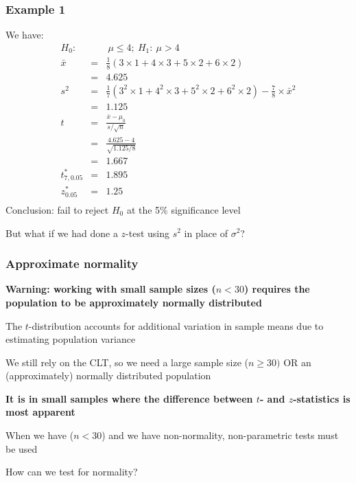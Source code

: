 \documentclass[t,8pt]{beamer}%
\begin{document}
\begin{frame}
	\frametitle{Example 1}
    We have:
    \begin{eqnarray*}
        H_0:&&\ \mu\leq 4;\ H_1:\ \mu>4 \\
        \bar{x} &=& \frac 18(3 \times 1 + 4 \times 3 + 5 \times 2 + 6 \times 2)\\
        &=& 4.625 \\
        s^2 &=& \frac 17(3^2 \times 1 + 4^2 \times 3 + 5^2 \times 2 + 6^2 \times 2)-\frac 78\times\bar x^2\\%
        &=& 1.125 \\
        t &=& \frac{\bar x - \mu_0}{s / \sqrt{n}}\\
        &=& \frac{4.625 - 4}{\sqrt{1.125/8}} \\
        &=& 1.667 \\
        t^*_{7,0.05}&=& 1.895 \\
        z^*_{0.05}&=& 1.25 \\
    \end{eqnarray*}
    Conclusion: fail to reject $H_0$ at the 5\% significance level \par
    But what if we had done a $z$-test using $s^2$ in place of $\sigma^2$?
\end{frame}

\begin{frame}
	\frametitle{Approximate normality}
    {\bf Warning: working with small sample sizes ($n<30$) requires the population to be approximately normally distributed} \par
    The $t$-distribution accounts for additional variation in sample means due to estimating population variance \par
    We still rely on the CLT, so we need a large sample size ($n\geq 30)$ OR an (approximately) normally distributed population \par
    {\bf It is in small samples where the difference between $t$- and $z$-statistics is most apparent} \par
    When we have ($n<30$) and we have non-normality, non-parametric tests must be used \par
    How can we test for normality?
\end{frame}
\end{document}
